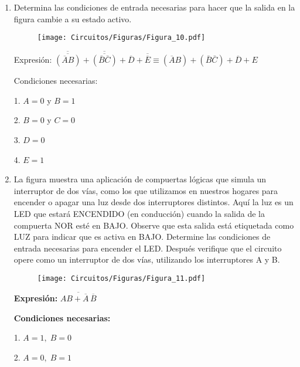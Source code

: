 \documentclass[a4paper, 12pt]{article}
\newcommand{\Aspace}{0.2cm}
\begin{document}
\begin{enumerate}
        \newpage
        \item Determina las condiciones de entrada necesarias para hacer que la salida en la figura cambie a su estado activo.
        \begin{figure}[!ht]
            \centering
            \texttt{[image: Circuitos/Figuras/Figura\_10.pdf]}
        \end{figure}
            \vspace{\Aspace} \par
            { \color{azul} 
                Expresión: $\overline{\overline{(\overline{A}B)}} + \overline{\overline{(\bar{B}\bar{C})}} + \overline{D} + \overline{\overline{E}} \equiv (\overline{A}B) + (\bar{B}\bar{C}) + \overline{D} + E$
                \par Condiciones necesarias:
                \par 1. $A = 0$ y $B = 1$
                \par 2. $B = 0$ y $C = 0$
                \par 3. $D = 0$
                \par 4. $E = 1$
            }



        \item La figura muestra una aplicación de compuertas lógicas que simula un interruptor de dos vías, como los que utilizamos en nuestros hogares para encender o apagar una luz desde dos interruptores distintos. Aquí la luz es un LED que estará ENCENDIDO (en conducción) cuando la salida de la compuerta NOR esté en BAJO. Observe que esta salida está etiquetada como LUZ para indicar que es activa en BAJO. Determine las condiciones de entrada necesarias para encender el LED. Después verifique que el circuito opere como un interruptor de dos vías, utilizando los interruptores A y B.
        \begin{figure}[!ht]
            \centering
            \texttt{[image: Circuitos/Figuras/Figura\_11.pdf]}
        \end{figure}
            { \color{azul}
                \begin{multicols}{2}
                    \noindent\textbf{Expresión:} $\overline{AB + \overline{A}\,\overline{B}}$ \par

                    \noindent\textbf{Condiciones necesarias:}
                    \par 1. \(A = 1,\; B = 0\)
                    \par 2. \(A = 0,\; B = 1\)


\end{multicols}}
\end{enumerate}
\end{document}
